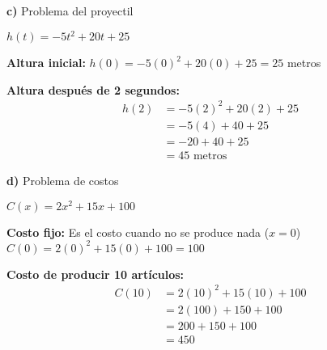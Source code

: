 \textbf{c)} Problema del proyectil

$h(t) = -5t^2 + 20t + 25$

\textbf{Altura inicial:} $h(0) = -5(0)^2 + 20(0) + 25 = 25$ metros

\textbf{Altura después de 2 segundos:}
\begin{align}
h(2) &= -5(2)^2 + 20(2) + 25\\
&= -5(4) + 40 + 25\\
&= -20 + 40 + 25\\
&= 45 \text{ metros}
\end{align}

\textbf{d)} Problema de costos

$C(x) = 2x^2 + 15x + 100$

\textbf{Costo fijo:} Es el costo cuando no se produce nada ($x = 0$)
$C(0) = 2(0)^2 + 15(0) + 100 = 100$

\textbf{Costo de producir 10 artículos:}
\begin{align}
C(10) &= 2(10)^2 + 15(10) + 100\\
&= 2(100) + 150 + 100\\
&= 200 + 150 + 100\\
&= 450
\end{align}